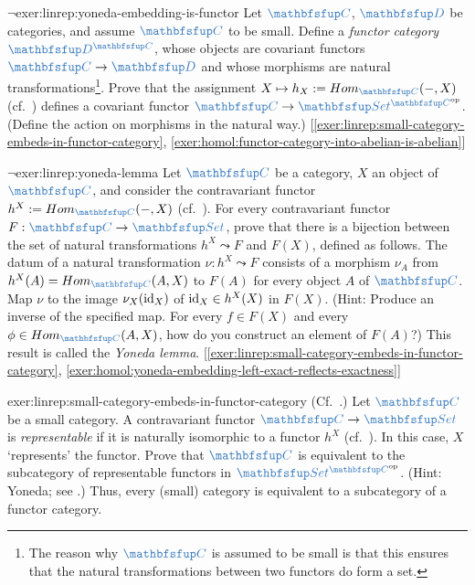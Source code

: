 \begin{exer}{$\lnot$}{exer:linrep:yoneda-embedding-is-functor}
  Let $\categ{C}$, $\categ{D}$ be categories, and assume $\categ{C}$
  to be small. Define a \emph{functor category}
  $\categ{D}^{\categ{C}}$, whose objects are covariant functors
  $\categ{C} \to \categ{D}$ and whose morphisms are natural
  transformations\footnote{The reason why $\categ{C}$ is assumed to be
    small is that this ensures that the natural transformations
    between two functors do form a set.}. Prove that the assignment
  $X \mapsto h_X := \Hom_{\categ{C}} (\mathord{-}, X)$ (cf.\
  ) defines a covariant
  functor $\categ{C} \to
  \categ{Set}^{\categ{C}^{\mathrm{op}}}$. (Define the action on
  morphisms in the natural way.)
  [\ref{exer:linrep:small-category-embeds-in-functor-category},
  \ref{exer:homol:functor-category-into-abelian-is-abelian}]
\end{exer}

\begin{exer}{$\lnot$}{exer:linrep:yoneda-lemma}
  Let $\categ{C}$ be a category, $X$ an object of $\categ{C}$, and
  consider the contravariant functor
  $h^X := \Hom_{\categ{C}} (\mathord{-}, X)$ (cf.\
  ). For every
  contravariant functor $F : \categ{C} \to \categ{Set}$, prove that
  there is a bijection between the set of natural transformations
  $h^X \leadsto F$ and $F(X)$, defined as follows. The datum of a
  natural transformation $\nu : h^X \leadsto F$ consists of a morphism
  $\nu_A$ from $h^X(A) = \Hom_{\categ{C}}(A, X)$ to $F(A)$ for every
  object $A$ of $\categ{C}$. Map $\nu$ to the image
  $\nu_X(\operatorname{id}_X)$ of $\operatorname{id}_X \in h^X(X)$ in
  $F(X)$. (Hint: Produce an inverse of the specified map. For every
  $f \in F(X)$ and every $\phi \in \Hom_{\categ{C}}(A, X)$, how do you
  construct an element of $F(A)$?) This result is called the
  \emph{Yoneda lemma}.
  [\ref{exer:linrep:small-category-embeds-in-functor-category},
  \ref{exer:homol:yoneda-embedding-left-exact-reflects-exactness}]
\end{exer}

\begin{exer}{}{exer:linrep:small-category-embeds-in-functor-category}
  (Cf.\ .) Let
  $\categ{C}$ be a small category. A contravariant functor
  $\categ{C} \to \categ{Set}$ is \emph{representable} if it is
  naturally isomorphic to a functor $h^X$ (cf.\
  ). In this case, $X$
  `represents' the functor. Prove that $\categ{C}$ is equivalent to
  the subcategory of representable functors in
  $\categ{Set}^{\categ{C}^{\mathrm{op}}}$. (Hint: Yoneda; see
  \Cref{exer:linrep:yoneda-lemma}.) Thus, every (small) category is
  equivalent to a subcategory of a functor category.
\end{exer}

